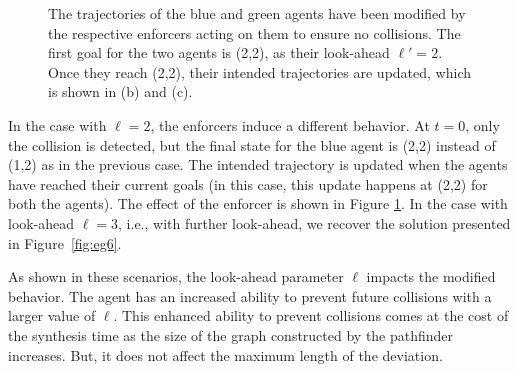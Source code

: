 \begin{figure}[!hbt]
{}
\caption{The trajectories of the blue and green agents have been modified by the respective enforcers acting on them to ensure no collisions. The first goal for the two agents is (2,2), as their look-ahead $\ell' = 2$. Once they reach (2,2), their intended trajectories are updated, which is shown in (b) and (c).}
\label{fig:ds_test}
\end{figure}

In the case with $\ell=2$, the enforcers induce a different behavior. At  $t=0$, only the collision is detected, but the final state for the blue agent is (2,2) instead of (1,2) as in the previous case. The intended trajectory is updated when the agents have reached their current goals (in this case, this update happens at (2,2) for both the agents). The effect of the enforcer is shown in Figure \ref{fig:ds_test}.  In the case with look-ahead $\ell=3$, i.e., with further look-ahead, we recover the solution presented in Figure~\ref{fig:eg6}.


As shown in these scenarios, the look-ahead parameter $\ell$ impacts the modified behavior. The agent has an increased ability to prevent future collisions with a larger value of $\ell$. This enhanced ability to prevent collisions comes at the cost of the synthesis time as the size of the graph constructed by the pathfinder increases. But, it does not affect the maximum length of the deviation.



